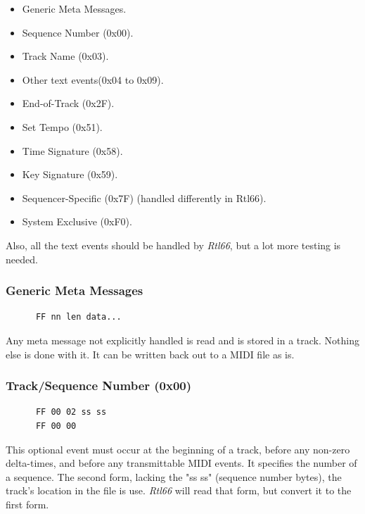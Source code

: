    \begin{itemize}
      \item Generic Meta Messages.
      \item Sequence Number (0x00).
      \item Track Name (0x03).
      \item Other text events(0x04 to 0x09).
      \item End-of-Track (0x2F).
      \item Set Tempo (0x51).
      \item Time Signature (0x58).
      \item Key Signature (0x59).
      \item Sequencer-Specific (0x7F) (handled differently in Rtl66).
      \item System Exclusive (0xF0).
   \end{itemize}

   Also, all the text events should be handled by \textsl{Rtl66}, but
   a lot more testing is needed.

\subsubsection{Generic Meta Messages}
\label{subsubsec:midi_meta_generic}

   \begin{verbatim}
      FF nn len data...
   \end{verbatim}

   Any meta message not explicitly handled is read and is stored in a track.
   Nothing else is done with it.
   It can be written back out to a MIDI file as is.

\subsubsection{Track/Sequence Number (0x00)}
\label{subsubsec:midi_meta_sequence_number}

   \begin{verbatim}
      FF 00 02 ss ss
      FF 00 00
   \end{verbatim}

   This optional event must occur at the beginning of a track,
   before any non-zero delta-times, and before any transmittable MIDI
   events.  It specifies the number of a sequence. The second form,
   lacking the "ss ss" (sequence number bytes), the track's location in the
   file is use. \textsl{Rtl66} will read that form, but convert it to
   the first form.

